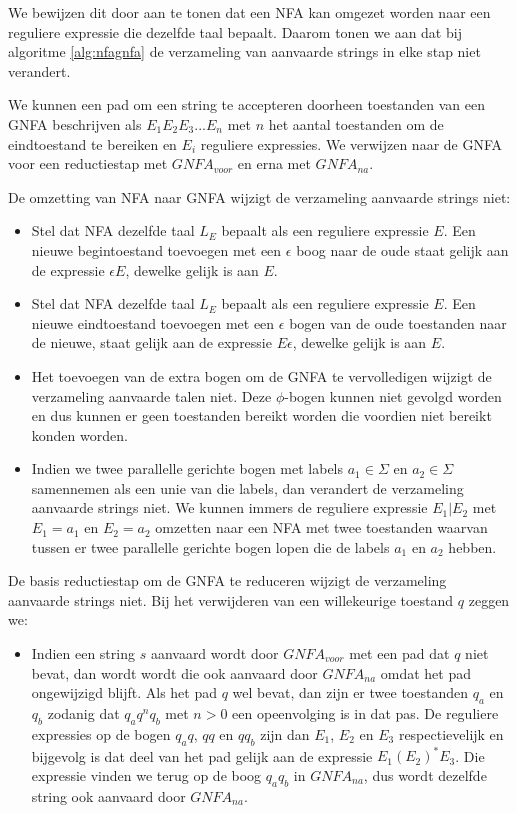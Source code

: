   We bewijzen dit door aan te tonen dat een NFA kan omgezet worden naar een reguliere expressie die dezelfde taal bepaalt. Daarom tonen we aan dat bij algoritme \ref{alg:nfagnfa} de verzameling van aanvaarde strings in elke stap niet verandert.
  
  We kunnen een pad om een string te accepteren doorheen toestanden van een GNFA beschrijven als $E_1E_2E_3...E_n$ met $n$ het aantal toestanden om de eindtoestand te bereiken en $E_i$ reguliere expressies. We verwijzen naar de GNFA voor een reductiestap met $GNFA_{voor}$ en erna met $GNFA_{na}$.
  \begin{enumalgo}
  \item De omzetting van NFA naar GNFA wijzigt de verzameling aanvaarde strings niet:
  \begin{itemize}
  \item Stel dat NFA dezelfde taal $L_E$ bepaalt als een reguliere expressie $E$. Een nieuwe begintoestand toevoegen met een $\epsilon$ boog naar de oude staat gelijk aan de expressie $\epsilon E$, dewelke gelijk is aan $E$.
  \item Stel dat NFA dezelfde taal $L_E$ bepaalt als een reguliere expressie $E$. Een nieuwe eindtoestand toevoegen met een $\epsilon$ bogen van de oude toestanden naar de nieuwe, staat gelijk aan de expressie $E\epsilon$, dewelke gelijk is aan $E$.
  \item Het toevoegen van de extra bogen om de GNFA te vervolledigen wijzigt de verzameling aanvaarde talen niet. Deze $\phi$-bogen kunnen niet gevolgd worden en dus kunnen er geen toestanden bereikt worden die voordien niet bereikt konden worden.
  \item Indien we twee parallelle gerichte bogen met labels $a_1 \in \Sigma$ en $a_2 \in \Sigma$ samennemen als een unie van die labels, dan verandert de verzameling aanvaarde strings niet. We kunnen immers de reguliere expressie $E_1|E_2$ met $E_1 = a_1$ en $E_2 = a_2$ omzetten naar een NFA met twee toestanden waarvan tussen er twee parallelle gerichte bogen lopen die de labels $a_1$ en $a_2$ hebben.
  \end{itemize}
  \item De basis reductiestap om de GNFA te reduceren wijzigt de verzameling aanvaarde strings niet. Bij het verwijderen van een willekeurige toestand $q$ zeggen we:
  \begin{itemize}
  \item Indien een string $s$ aanvaard wordt door $GNFA_{voor}$ met een pad dat $q$ niet bevat, dan wordt wordt die ook aanvaard door $GNFA_{na}$ omdat het pad ongewijzigd blijft. Als het pad $q$ wel bevat, dan zijn er twee toestanden $q_a$ en $q_b$ zodanig dat $q_aq^nq_b$ met $n > 0$ een opeenvolging is in dat pas. De reguliere expressies op de bogen $q_aq$, $qq$ en $qq_b$ zijn dan $E_1$, $E_2$ en $E_3$ respectievelijk en bijgevolg is dat deel van het pad gelijk aan de expressie $E_1(E_2)^*E_3$. Die expressie vinden we terug op de boog $q_aq_b$ in $GNFA_{na}$, dus wordt dezelfde string ook aanvaard door $GNFA_{na}$.

\end{itemize}
\end{enumalgo}
